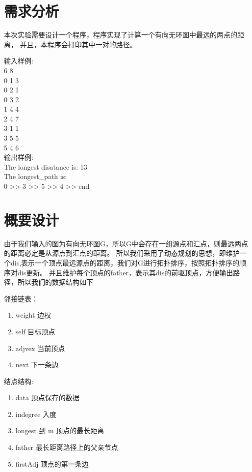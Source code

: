 \section{需求分析}
	本次实验需要设计一个程序，程序实现了计算一个有向无环图中最远的两点的距离，
	并且，本程序会打印其中一对的路径。

	
	输入样例:\\
	6 8 \\
	0 1 3 \\
	0 2 1 \\
	0 3 2 \\
	1 4 4 \\
	2 4 7 \\
	3 1 1 \\
	3 5 5 \\
	5 4 6 \\

	输出样例:\\
	The longest disatance is: 13\\
	The longest\_path is:\\
	0 >> 3 >> 5 >> 4 >> end\\


	
\section{概要设计}
	由于我们输入的图为有向无环图G，所以G中会存在一组源点和汇点，则最远两点的距离必定是从源点到汇点的距离。
	所以我们采用了动态规划的思想，即维护一个dis,表示一个顶点最远源点的距离，我们对G进行拓扑排序，按照拓扑排序的顺序对dis更新。
	并且维护每个顶点的father，表示其dis的前驱顶点，方便输出路径，所以我们的数据结构如下


	邻接链表：
	\begin{enumerate}
		\item weight 边权
		\item self 目标顶点
		\item adjvex 当前顶点
		\item next 下一条边
	\end{enumerate}


	结点结构:
	\begin{enumerate}
		\item data 顶点保存的数据
		\item indegree 入度
		\item longest 到 m 顶点的最长距离
		\item father 最长距离路径上的父亲节点
		\item firstAdj 顶点的第一条边
	\end{enumerate}


